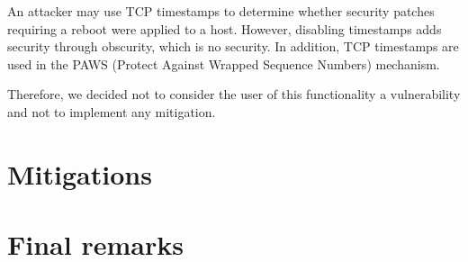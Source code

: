 \documentclass[draft]{homework}
\begin{document}
    An attacker may use TCP timestamps to determine whether security patches requiring a reboot were applied to a host.
    However, disabling timestamps adds security through obscurity, which is no security. 
    In addition, TCP timestamps are used in the PAWS (Protect Against Wrapped Sequence Numbers) mechanism.
    
    Therefore, we decided not to consider the user of this functionality a vulnerability and not to implement any mitigation.
    
    
    
    \section{Mitigations}
    
    
    \section{Final remarks}
\end{document}
